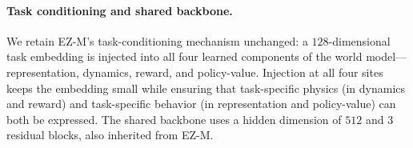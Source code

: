 \paragraph{Task conditioning and shared backbone.} We retain EZ-M's task-conditioning mechanism unchanged: a $128$-dimensional task embedding is injected into all four learned components of the world model---representation, dynamics, reward, and policy-value. Injection at all four sites keeps the embedding small while ensuring that task-specific physics (in dynamics and reward) and task-specific behavior (in representation and policy-value) can both be expressed. The shared backbone uses a hidden dimension of $512$ and 3 residual blocks, also inherited from EZ-M.
